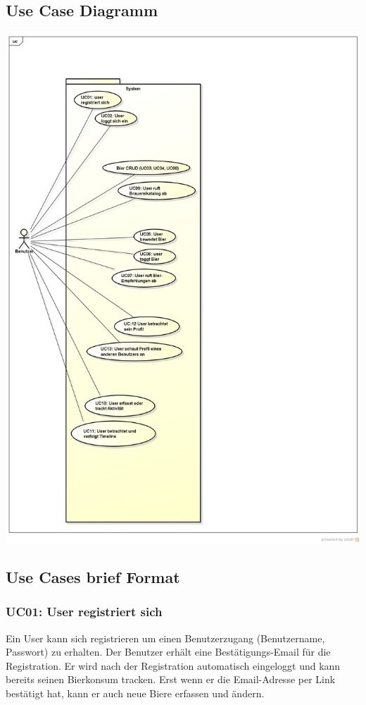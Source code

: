 \documentclass[10pt,a4paper]{scrartcl}
\begin{document}
\subsection{Use Case Diagramm}
\includegraphics[width=\textwidth]{UseCaseDiagramm.jpg} 
\subsection{Use Cases brief Format}

\subsubsection*{UC01: User registriert sich}
Ein User kann sich registrieren um einen Benutzerzugang (Benutzername, Passwort) zu erhalten. Der Benutzer erhält eine Bestätigungs-Email für die Registration. Er wird nach der Registration automatisch eingeloggt und kann bereits seinen Bierkonsum tracken. Erst wenn er die Email-Adresse per Link bestätigt hat, kann er auch neue Biere erfassen und ändern.
\end{document}
